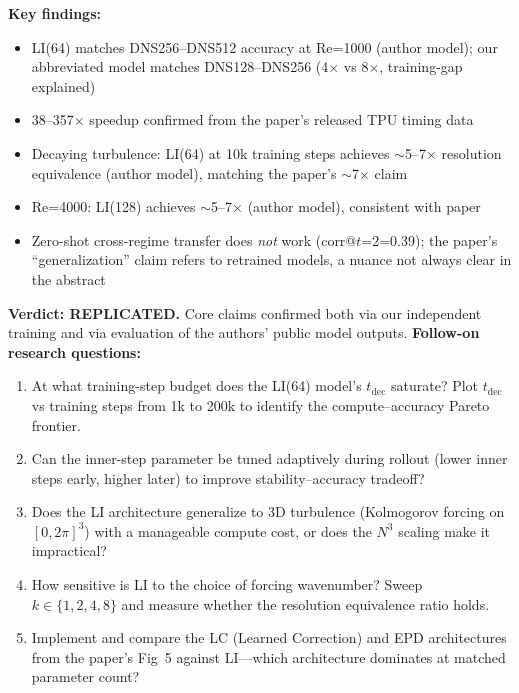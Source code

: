 \documentclass[11pt]{article}
\begin{document}
\noindent\textbf{Key findings:}
\begin{itemize}[leftmargin=1.4em,itemsep=0.2em,topsep=0.2em]
\item LI(64) matches DNS256--DNS512 accuracy at Re=1000 (author model); our abbreviated model matches DNS128--DNS256 (4$\times$ vs 8$\times$, training-gap explained)
\item 38--357$\times$ speedup confirmed from the paper's released TPU timing data
\item Decaying turbulence: LI(64) at 10k training steps achieves $\sim$5--7$\times$ resolution equivalence (author model), matching the paper's $\sim$7$\times$ claim
\item Re=4000: LI(128) achieves $\sim$5--7$\times$ (author model), consistent with paper
\item Zero-shot cross-regime transfer does \emph{not} work (corr@$t$=2=0.39); the paper's ``generalization'' claim refers to retrained models, a nuance not always clear in the abstract
\end{itemize}
\noindent\textbf{Verdict: REPLICATED.} Core claims confirmed both via our independent training and via evaluation of the authors' public model outputs.
\noindent\textbf{Follow-on research questions:}
\begin{enumerate}[leftmargin=1.6em,itemsep=0.2em,topsep=0.2em,label=Q\arabic*.]
\item At what training-step budget does the LI(64) model's $t_{\mathrm{dec}}$ saturate? Plot $t_{\mathrm{dec}}$ vs training steps from 1k to 200k to identify the compute--accuracy Pareto frontier.
\item Can the inner-step parameter be tuned adaptively during rollout (lower inner steps early, higher later) to improve stability--accuracy tradeoff?
\item Does the LI architecture generalize to 3D turbulence (Kolmogorov forcing on $[0,2\pi]^3$) with a manageable compute cost, or does the $N^3$ scaling make it impractical?
\item How sensitive is LI to the choice of forcing wavenumber? Sweep $k \in \{1,2,4,8\}$ and measure whether the resolution equivalence ratio holds.
\item Implement and compare the LC (Learned Correction) and EPD architectures from the paper's Fig~5 against LI---which architecture dominates at matched parameter count?
\end{enumerate}
\end{document}
